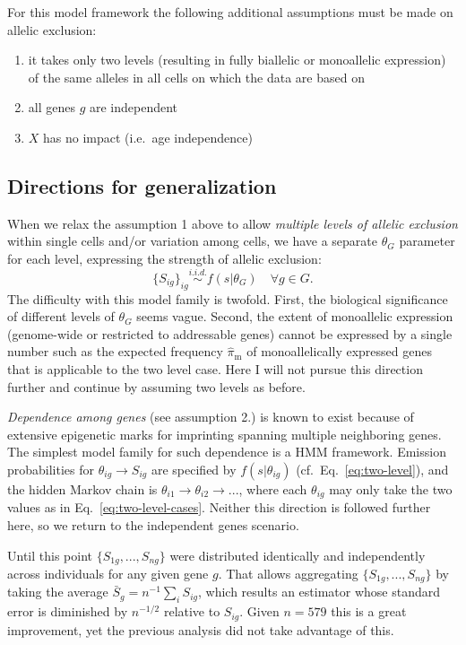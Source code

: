 \documentclass[letterpaper]{article}
\begin{document}
For this model framework the following additional assumptions must be made on
allelic exclusion:
\begin{enumerate}
\item it takes only two levels (resulting in fully biallelic or monoallelic
expression) of the same alleles in all cells on which the data are based on
\item all genes $g$ are independent
\item $X$ has no impact (i.e.~age independence)
\end{enumerate}

\subsection{Directions for generalization}

When we relax the assumption 1 above to allow \emph{multiple levels of allelic exclusion}
within single cells and/or variation among cells, we have a separate
$\theta_G$ parameter for each level, expressing the strength of allelic
exclusion:
\begin{equation*}
\{S_{ig}\}_{ig} \overset{i.i.d.}{\sim} f(s | \theta_G) \quad \forall g \in G.
\end{equation*}
The difficulty with this model family is twofold.  First, the biological
significance of different levels of $\theta_G$ seems vague.  Second, the
extent of monoallelic expression (genome-wide or restricted to addressable
genes) cannot be expressed by a single number such as the expected
frequency $\hat{\pi}_\mathrm{m}$ of monoallelically expressed genes that is applicable
to the two level case.  Here I will not pursue this direction further and
continue by assuming two levels as before.

\emph{Dependence among genes} (see assumption 2.) is known to exist because of extensive epigenetic
marks for imprinting spanning multiple neighboring genes.  The simplest model
family for such dependence is a HMM framework.  Emission probabilities for
\(\theta_{ig}\rightarrow S_{ig}\) are specified by \(f(s | \theta_{ig})\)
(cf.~Eq.~\ref{eq:two-level}), and
the hidden Markov chain is
\(\theta_{i1}\rightarrow\theta_{i2}\rightarrow...\), where each
\(\theta_{ig}\) may only take the two values as in
Eq.~\ref{eq:two-level-cases}.  Neither this direction is followed further
here, so we return to the independent genes scenario.

Until this point \(\{S_{1g},...,S_{ng}\}\) were distributed identically and
independently across individuals for any given gene \(g\).  That allows
aggregating \(\{S_{1g},...,S_{ng}\}\) by taking the average
\(\bar{S}_g=n^{-1}\sum_i S_{ig}\), which results an estimator whose standard
error is diminished by \(n^{-1/2}\) relative to \(S_{ig}\).  Given $n=579$
this is a great improvement, yet the previous analysis did not take advantage
of this.
\end{document}
